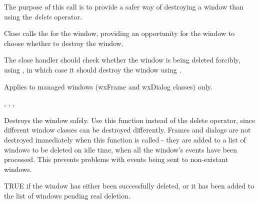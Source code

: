 
\label{wxwindowclose}


The purpose of this call is to provide a safer way of destroying a window than using
the {\it delete} operator.




Close calls the  for the window, providing an opportunity for the window to
choose whether to destroy the window.

The close handler should check whether the window is being deleted forcibly,
using , in which case it should
destroy the window using .

Applies to managed windows (wxFrame and wxDialog classes) only.


,\rtfsp
{},\rtfsp
{},\rtfsp
{}

\label{wxwindowdestroy}


Destroys the window safely. Use this function instead of the delete operator, since
different window classes can be destroyed differently. Frames and dialogs
are not destroyed immediately when this function is called - they are added
to a list of windows to be deleted on idle time, when all the window's events
have been processed. This prevents problems with events being sent to non-existant
windows.


TRUE if the window has either been successfully deleted, or it has been added
to the list of windows pending real deletion.


